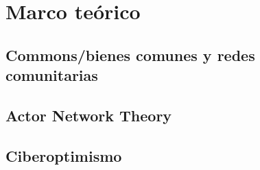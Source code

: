\section{Marco teórico}

\subsection{Commons/bienes comunes y redes comunitarias}

\begin{comment}
## "community"

> The term “community” has played a central role in American affective politics for a long time,
> and as Cherry Schrecker (2006) argues, this thoroughly positive connotation carries, with ex-
> tremely few exceptions, through most of Anglo-Saxon sociology.

* en alemán: más ambiguo (los nacis y la "Volksgemeinschaft")
* español? ("comunidad", "comunitari@");
\end{comment}

\subsection{Actor Network Theory}

\begin{comment}
[Venturini2010a]

"In controversies, any actor can decompose in a loose
network and any network, not matter how heterogeneous, can coagulate to function as
an actor."

"To understand how social phenomena are built it is not
enough to observe the actors alone nor is it enough to observe social networks once they are
stabilized. What should be observed are the actors-networks—that is to say, the fleeting con-
figurations where actors are renegotiating the ties of old networks and the emergence of new
networks is redefining the identity of actors."

"an actor is anything doing something. "

"there is no such thing as an isolated actor. Actors are always composed
by and components of networks."

"Actors are such because they inter-act, shaping relations"

\end{comment}

\subsection{Ciberoptimismo}


